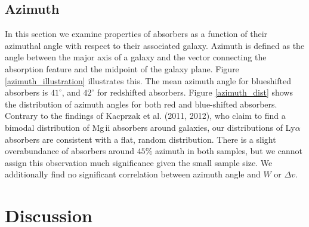 \documentclass[iop]{emulateapj-rtx4}
\begin{document}
\subsection{Azimuth}
In this section we examine properties of absorbers as a function of their azimuthal angle with respect to their associated galaxy. Azimuth is defined as the angle between the major axis of a galaxy and the vector connecting the absorption feature and the midpoint of the galaxy plane. Figure \ref{azimuth_illustration} illustrates this. The mean azimuth angle for blueshifted absorbers is $41^{\circ}$, and $42^{\circ}$ for redshifted absorbers. Figure \ref{azimuth_dist} shows the distribution of azimuth angles for both red and blue-shifted absorbers. Contrary to the findings of Kacprzak et al. (2011, 2012), who claim to find a bimodal distribution of Mg\,{\sc ii} absorbers around galaxies, our distributions of Ly$\alpha$ absorbers are consistent with a flat, random distribution. There is a slight overabundance of absorbers around $45\%$ azimuth in both samples, but we cannot assign this observation much significance given the small sample size. We additionally find no significant correlation between azimuth angle and $W$ or $\Delta v$. 







\section{Discussion}

\end{document}
